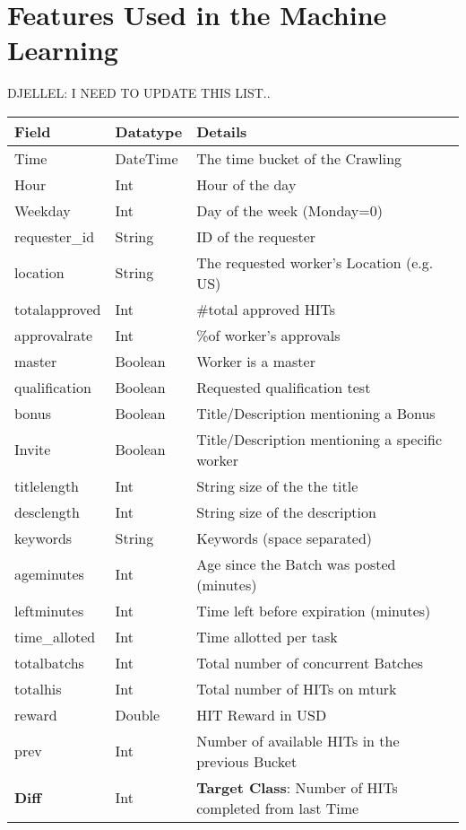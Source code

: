 \appendix

\section{Features Used in the Machine Learning}
DJELLEL: I NEED TO UPDATE THIS LIST..
\begin{table}[h]
\begin{tabular}{|l|l|l|}
\hline
\textbf{Field} & \textbf{Datatype} & \textbf{Details}\\ \hline\hline
Time     &  DateTime & The time bucket of the Crawling\\ \hline
Hour      & Int    &  Hour of the day   \\ \hline
Weekday      & Int   &  Day of the week (Monday=0)  \\ \hline
requester\_id     & String &   ID of the requester       \\ \hline
location      & String &  The requested worker's Location (e.g. US)       \\ \hline
totalapproved    & Int &  \#total approved HITs      \\ \hline
approvalrate      & Int&   \%of worker's approvals       \\ \hline
master     &  Boolean    &  Worker is a master  \\ \hline
qualification    &Boolean  &   Requested qualification test       \\ \hline
bonus      &Boolean    &  Title/Description mentioning a Bonus    \\ \hline
Invite      & Boolean     &    Title/Description mentioning a specific worker\\ \hline
titlelength      & Int&   String size of the the title       \\ \hline
desclength    & Int &  String size of the description      \\ \hline
keywords      & String & Keywords (space separated)        \\ \hline
ageminutes      &  Int  &  Age since the Batch was posted (minutes)   \\ \hline
leftminutes      & Int  & Time left before expiration (minutes) \\ \hline
time\_alloted    & Int &  Time allotted per task   \\ \hline
totalbatchs      & Int  & Total number of concurrent Batches      \\ \hline
totalhis      & Int    &  Total number of HITs on mturk   \\ \hline
reward    & Double      & HIT Reward in USD  \\ \hline
prev      & Int     &  Number of available HITs in the previous Bucket  \\ \hline
\textbf{Diff}      & Int &   \textbf{Target Class}: Number of HITs completed from last Time \\ \hline
\end{tabular}
\end{table}